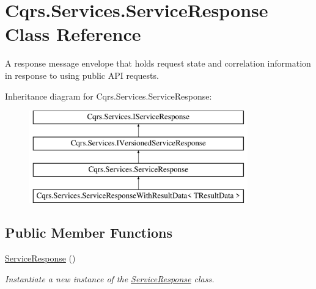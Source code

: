 \hypertarget{classCqrs_1_1Services_1_1ServiceResponse}{}\section{Cqrs.\+Services.\+Service\+Response Class Reference}
\label{classCqrs_1_1Services_1_1ServiceResponse}


A response message envelope that holds request state and correlation information in response to using public A\+PI requests.  


Inheritance diagram for Cqrs.\+Services.\+Service\+Response\+:\begin{figure}[H]
\begin{center}
\leavevmode
\includegraphics[height=4.000000cm]{classCqrs_1_1Services_1_1ServiceResponse}
\end{center}
\end{figure}
\subsection*{Public Member Functions}
\begin{DoxyCompactItemize}
\item 
\hyperlink{classCqrs_1_1Services_1_1ServiceResponse_a889c3d406ffbac960699e13616f9f38b_a889c3d406ffbac960699e13616f9f38b}{Service\+Response} ()
\begin{DoxyCompactList}\small\item\em Instantiate a new instance of the \hyperlink{classCqrs_1_1Services_1_1ServiceResponse}{Service\+Response} class. \end{DoxyCompactList}\end{DoxyCompactItemize}
